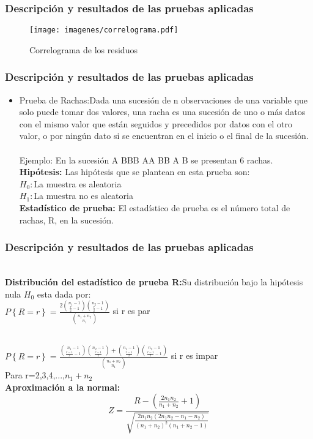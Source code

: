 \documentclass[12pt]{beamer}
\begin{document}
\begin{frame}
\frametitle{Descripción y resultados de las pruebas aplicadas}
\begin{figure}[!h]
    \begin{center}
        \texttt{[image: imagenes/correlograma.pdf]}
        \caption{Correlograma de los residuos}
        \label{fig:Densidad}
    \end{center}
\end{figure}
\end{frame}

\begin{frame}
\frametitle{Descripción y resultados de las pruebas aplicadas}
\begin{itemize}
\item Prueba de Rachas:Dada una sucesión de n observaciones de una variable que solo puede tomar dos valores, una racha es una sucesión de uno o más datos con el mismo valor que están seguidos y precedidos por datos con el otro valor, o por ningún dato si se encuentran en el inicio o el final de la sucesión.
~\\ Ejemplo: En la sucesión A BBB AA BB A B se presentan 6 rachas.
~\\ \textbf{Hipótesis:} Las hipótesis que se plantean en esta prueba son:
~\\$H_{0}:$La muestra es aleatoria
~\\$H_{1}:$La muestra no es aleatoria
~\\ \textbf{Estadístico de prueba:} El estadístico de prueba es el número total de rachas, R, en la sucesión.
\end{itemize}
\end{frame}

\begin{frame}
\frametitle{Descripción y resultados de las pruebas aplicadas}
~\\ \textbf{Distribución del estadístico de prueba R:}Su distribución bajo la hipótesis nula $H_{0}$ esta dada por:
~\\$P\left\lbrace{R=r}\right\rbrace=\frac{2\binom{n_{1}-1}{\frac{r}{2}-1}\binom{n_{2}-1}{\frac{r}{2}-1}}{\binom{n_{1}+n_{2}}{n_{1}}}$ si r es par

~\\$P\left\lbrace{R=r}\right\rbrace=\frac{\binom{n_{1}-1}{\frac{r-1}{2}-1}\binom{n_{2}-1}{\frac{r-1}{2}}+\binom{n_{1}-1}{\frac{r-1}{2}}\binom{n_{2}-1}{\frac{r-1}{2}-1}}{\binom{n_{1}+n_{2}}{n_{1}}}$ si r es impar
~\\Para r=2,3,4,...,$n_{1}+n_{2}$
~\\ \textbf{Aproximación a la normal:}
$$Z=\frac{R-\left(\frac{2n_{1}n_{2}}{n_{1}+n_{2}}+1\right)}{\sqrt{\frac{2n_{1}n_{2}(2n_{1}n_{2}-n_{1}-n_{2})}{(n_{1}+n_{2})^2 (n_{1}+n_{2}-1)}}} $$
\end{frame}
\end{document}
